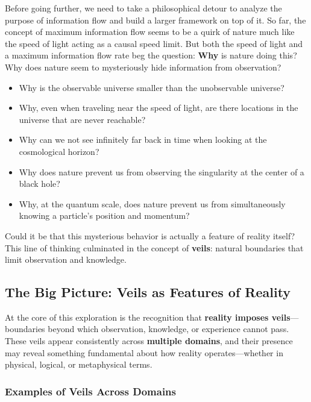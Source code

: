 \documentclass[12pt]{article}
\begin{document}
Before going further, we need to take a philosophical detour to analyze the purpose of information flow and build a larger framework on top of it. So far, the concept of maximum information flow seems to be a quirk of nature much like the speed of light acting as a causal speed limit. But both the speed of light and a maximum information flow rate beg the question: \textbf{Why} is nature doing this? Why does nature seem to mysteriously hide information from observation?
\begin{itemize}
    \item Why is the observable universe smaller than the unobservable universe?
    \item Why, even when traveling near the speed of light, are there locations in the universe that are never reachable?
    \item Why can we not see infinitely far back in time when looking at the cosmological horizon?
    \item Why does nature prevent us from observing the singularity at the center of a black hole?
    \item Why, at the quantum scale, does nature prevent us from simultaneously knowing a particle's position and momentum?
\end{itemize}

Could it be that this mysterious behavior is actually a feature of reality itself? This line of thinking culminated in the concept of \textbf{veils}: natural boundaries that limit observation and knowledge.

\subsection{The Big Picture: Veils as Features of Reality}

At the core of this exploration is the recognition that \textbf{reality imposes veils}—boundaries beyond which observation, knowledge, or experience cannot pass. These veils appear consistently across \textbf{multiple domains}, and their presence may reveal something fundamental about how reality operates—whether in physical, logical, or metaphysical terms.

\subsubsection{Examples of Veils Across Domains}
\end{document}
